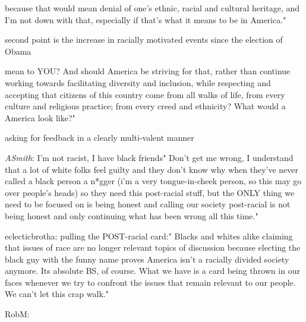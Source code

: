 \startitemize
\item
  because that would mean denial of one's ethnic, racial and cultural
  heritage, and I'm not down with that, especially if that's what it
  means to be  in America."
\item
  second point is the increase in racially motivated events since the
  election of Obama
\item
   mean to YOU? And should America
  be striving for that, rather than continue working towards
  facilitating diversity and inclusion, while respecting and
  accepting that citizens of this country come from all walks of
  life, from every culture and religious practice; from every creed
  and ethnicity? What would a  America look
  like?"
  \startitemize
  \item
    asking for feedback in a clearly multi-valent manner
  \item
    {\em ASmith}:
    I'm
    not racist, I have black friends" Don't get me wrong, I understand
    that a lot of white folks feel guilty and they don't know why when
    they've never called a black person a n*gger (i'm a very
    tongue-in-cheek person, so this may go over people's heads) so they
    need this post-racial stuff, but the ONLY thing we need to be
    focused on is being honest and calling our society post-racial is
    not being honest and only continuing what has been wrong all this
    time."
  \item
    eclecticbrotha:
    pulling
    the POST-racial card:" Blacks and whites alike claiming that issues
    of race are no longer relevant topics of discussion because
    electing the black guy with the funny name proves America isn't a
    racially divided society anymore. Its absolute BS, of course. What
    we have is a  card being
    thrown in our faces whenever we try to confront the issues that
    remain relevant to our people. We can't let this crap walk."
  \item
    RobM:
  \item

